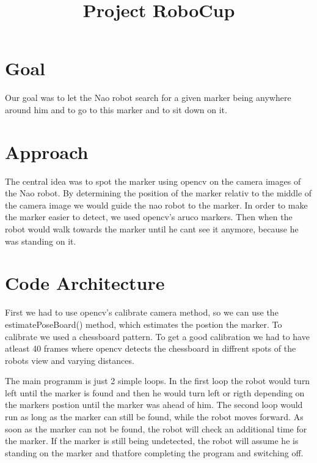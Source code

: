 \documentclass{article}
\title{Project RoboCup}
\begin{document}
\maketitle

\tableofcontents

\section{Goal}
Our goal was to let the Nao robot search for a given marker being anywhere around him and to go to this marker and to sit down on it.

\section{Approach}
The central idea was to spot the marker using opencv on the camera images of the Nao robot. By determining the position of the marker relativ to the middle of the camera image we would guide the nao robot to the marker. In order to make the marker easier to detect, we used opencv's aruco markers. Then when the robot would walk towards the marker until he cant see it anymore, because he was standing on it.

\section{Code Architecture}
First we had to use opencv's calibrate camera method, so we can use the estimatePoseBoard() method, which estimates the postion the marker. To calibrate we used a chessboard pattern. To get a good calibration we had to have atleast 40 frames where opencv detects the chessboard in diffrent spots of the robots view and varying distances.

The main programm is just 2 simple loops. In the first loop the robot would turn left until the marker is found and then he would turn left or rigth depending on the markers postion until the marker was ahead of him. The second loop would run as long as the marker can still be found, while the robot moves forward. As soon as the marker can not be found, the robot will check an additional time for the marker. If the marker is still being undetected, the robot will assume he is standing on the marker and thatfore completing the program and switching off.
\end{document}
